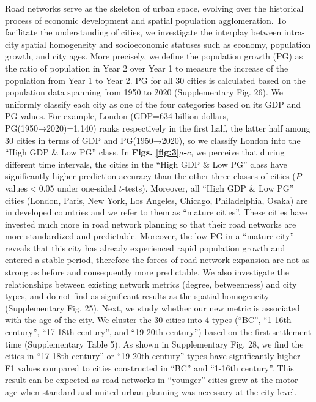 \documentclass[10pt]{wlscirep}
\begin{document}
Road networks serve as the skeleton of urban space, evolving over the historical process of economic development and spatial population agglomeration. To facilitate the understanding of cities, we investigate the interplay between intra-city spatial homogeneity and socioeconomic statuses such as economy, population growth, and city ages. More precisely, we define the population growth (PG) as the ratio of population in Year 2 over Year 1 to measure the increase of the population from Year 1 to Year 2. PG for all 30 cities is calculated based on the population data spanning from 1950 to 2020 (Supplementary Fig. 26). We uniformly classify each city as one of the four categories based on its GDP and PG values. For example, London (GDP=634 billion dollars, PG(1950→2020)=1.140) ranks respectively in the first half, the latter half among 30 cities in terms of GDP and PG(1950→2020), so we classify London into the “High GDP $\&$ Low PG” class. In \textbf{Figs. \ref{fig:3}$a$-$c$}, we perceive that during different time intervals, the cities in the “High GDP $\&$ Low PG” class have significantly higher prediction accuracy than the other three classes of cities ($P$-values$<$0.05 under one-sided $t$-tests). Moreover, all “High GDP $\&$ Low PG” cities (London, Paris, New York, Los Angeles, Chicago, Philadelphia, Osaka) are in developed countries and we refer to them as “mature cities”. These cities have invested much more in road network planning so that their road networks are more standardized and predictable. Moreover, the low PG in a “mature city” reveals that this city has already experienced rapid population growth and entered a stable period, therefore the forces of road network expansion are not as strong as before and consequently more predictable. We also investigate the relationships between existing network metrics (degree, betweenness) and city types, and do not find as significant results as the spatial homogeneity (Supplementary Fig. 25). Next, we study whether our new metric is associated with the age of the city. We cluster the 30 cities into 4 types (“BC”, “1-16th century”, “17-18th century”, and “19-20th century”) based on the first settlement time (Supplementary Table 5). As shown in Supplementary Fig. 28, we find the cities in “17-18th century” or “19-20th century” types have significantly higher F1 values compared to cities constructed in “BC” and “1-16th century”. This result can be expected as road networks in “younger” cities grew at the motor age when standard and united urban planning was necessary at the city level.
\end{document}
